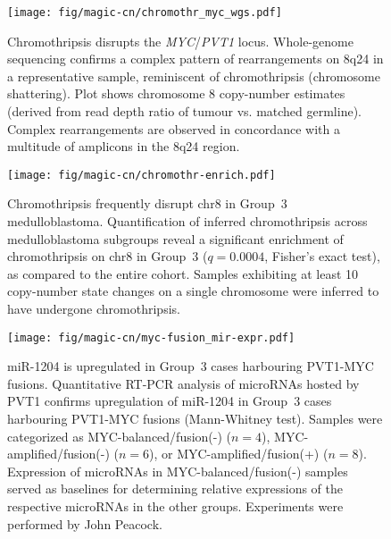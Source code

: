 \documentclass[11pt,letterpaper]{article}
\theoremstyle{definition}
\begin{document}
\begin{figure}[h]
	\begin{center}
		\texttt{[image: fig/magic-cn/chromothr\_myc\_wgs.pdf]}
	\end{center}
	\caption[Chromothripsis disrupts the \emph{MYC}/\emph{PVT1} locus.]
	{
	Chromothripsis disrupts the \emph{MYC}/\emph{PVT1} locus.
	Whole-genome sequencing confirms a complex pattern of rearrangements on 8q24 in a representative sample, reminiscent of chromothripsis (chromosome shattering).
	Plot shows chromosome 8 copy-number estimates (derived from read depth ratio of tumour vs. matched germline).
	Complex rearrangements are observed in concordance with a multitude of amplicons in the 8q24 region.
	}
	\label{fig:chromothr_myc_wgs}
\end{figure}

\begin{SCfigure}
	\centering
	\texttt{[image: fig/magic-cn/chromothr-enrich.pdf]}
	\caption[Chromothripsis frequently disrupt chr8 in Group~3 medulloblastoma]
	{
	Chromothripsis frequently disrupt chr8 in Group~3 medulloblastoma.
	Quantification of inferred chromothripsis across medulloblastoma subgroups reveal a significant enrichment of chromothripsis on chr8 in Group~3 ($q = 0.0004$, Fisher's exact test), as compared to the entire cohort. Samples exhibiting at least 10 copy-number state changes on a single chromosome were inferred to have undergone chromothripsis.
	}
	\label{fig:chromothr-enrich}
\end{SCfigure}

\begin{figure}[h]
	\begin{center}
		\texttt{[image: fig/magic-cn/myc-fusion\_mir-expr.pdf]}
	\end{center}
	\caption[miR-1204 is upregulated in Group~3 cases harbouring PVT1-MYC fusions]
	{
	miR-1204 is upregulated in Group~3 cases harbouring PVT1-MYC fusions.
	Quantitative RT-PCR analysis of microRNAs hosted by PVT1 confirms upregulation of miR-1204 in Group~3 cases harbouring PVT1-MYC fusions (Mann-Whitney test). Samples were categorized as MYC-balanced/fusion(-) ($n = 4$), MYC-amplified/fusion(-) ($n = 6$), or MYC-amplified/fusion(+) ($n = 8$). Expression of microRNAs in MYC-balanced/fusion(-) samples served as baselines for determining relative expressions of the respective microRNAs in the other groups. Experiments were performed by John Peacock.
	}
	\label{fig:myc-fusion_mir-expr}
\end{figure}
\end{document}
